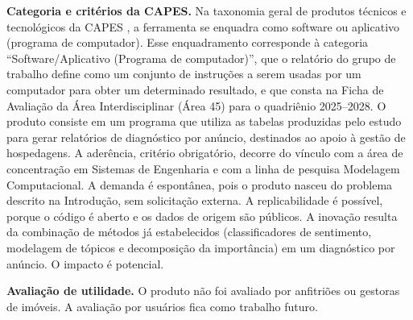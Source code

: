 \textbf{Categoria e critérios da CAPES.} Na taxonomia geral de produtos técnicos e tecnológicos da CAPES \citep{capes2019}, a ferramenta se enquadra como software ou aplicativo (programa de computador). Esse enquadramento corresponde à categoria “Software/Aplicativo (Programa de computador)”, que o relatório do grupo de trabalho define como um conjunto de instruções a serem usadas por um computador para obter um determinado resultado, e que consta na Ficha de Avaliação da Área Interdisciplinar (Área 45) para o quadriênio 2025–2028. O produto consiste em um programa que utiliza as tabelas produzidas pelo estudo para gerar relatórios de diagnóstico por anúncio, destinados ao apoio à gestão de hospedagens. A aderência, critério obrigatório, decorre do vínculo com a área de concentração em Sistemas de Engenharia e com a linha de pesquisa Modelagem Computacional. A demanda é espontânea, pois o produto nasceu do problema descrito na Introdução, sem solicitação externa. A replicabilidade é possível, porque o código é aberto e os dados de origem são públicos. A inovação resulta da combinação de métodos já estabelecidos (classificadores de sentimento, modelagem de tópicos e decomposição da importância) em um diagnóstico por anúncio. O impacto é potencial.

\textbf{Avaliação de utilidade.} O produto não foi avaliado por anfitriões ou gestoras de imóveis. A avaliação por usuários fica como trabalho futuro.
